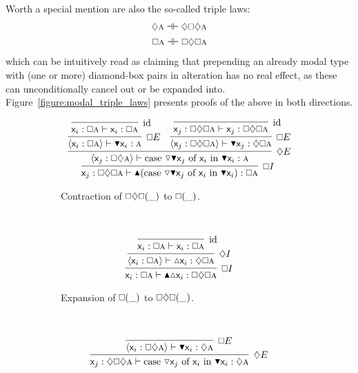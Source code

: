 Worth a special mention are also the so-called triple laws:
\begin{align}
	\diamond\prop{a} \dashv\vdash \diamond\bx\diamond\prop{a}\\
	\bx\prop{a} \dashv\vdash \bx\diamond\bx\prop{a}
\end{align}
which can be intuitively read as claiming that prepending an already modal type with (one or more) diamond-box pairs in alteration has no real effect, as these can unconditionally cancel out or be expanded into.
Figure~\ref{figure:modal_triple_laws} presents proofs of the above in both directions.


\begin{figure}
	\centering
	\begin{subfigure}{1\textwidth}
		\[
			\infer[\bx I]{\term{\varj}: \bx\diamond\bx\prop{a} \vdash \boxintro(\caseof{\diaelim \boxelim \varj}{\vari }{\boxelim{\vari }}): \bx\prop{a}}{
				\infer[\diamond E]{\bracket{\term{\varj}: \bx\diamond \prop{a}} \vdash \caseof{\diaelim \boxelim \varj}{\vari }{\boxelim{\vari }}: \prop{a}}{
					\infer[\bx E]{\bracket{\term{\vari }: \bx \prop{a}} \vdash \term{\boxelim \vari }:\prop{a}}{
						\infer[\Ax]{\term{\vari }: \bx\prop{a} \vdash \term{\vari }: \bx\prop{a}}{}
					}
					&
					\infer[\bx E]{\bracket{\term{\varj}:\bx\diamond\bx\prop{a}} \vdash \term{\boxelim \varj}:\diamond\bx\prop{a}}{
						\infer[\Ax]{\term{\varj}: \bx\diamond\bx\prop{a}\vdash\term{\varj}:\bx\diamond\bx\prop{a}}{}
					}
				}
			}
		\]
		\caption{Contraction of $\bx\diamond\bx(\_)$ to $\bx(\_)$.}
		\label{subfigure:triple_law:box_collapse}
	\end{subfigure}\\[\midsep]
	\begin{subfigure}{1\textwidth}
		\[
			\infer[\bx I]{\term{\vari }:\bx\prop{a} \vdash \boxintro\diaintro\term{\vari }:\bx\diamond\bx\prop{a}}{
				\infer[\diamond I]{\bracket{\term{\vari }: \bx\prop{a}} \vdash \diaintro\term{\vari }:\diamond\bx\prop{a}}{
					\infer[\Ax]{\term{\vari }:\bx\prop{a}\vdash \term{\vari }:\bx\prop{a}}{}
				}
			}
		\]
		\caption{Expansion of $\bx(\_)$ to $\bx\diamond\bx(\_)$.}
		\label{subfigure:triple_law:box_expand}
	\end{subfigure}\\[\midsep]
	\begin{subfigure}{1\textwidth}
		\[
			\infer[\diamond E]{\term{\varj}:\diamond\bx\diamond\prop{a} \vdash \caseof{\diaelim \varj}{\vari }{\boxelim \vari }: \diamond\prop{a}}{
				\infer[\bx E]{\bracket{\term{\vari }: \bx\diamond\prop{a}} \vdash \boxelim\term{\vari }: \diamond\prop{a}}{
}}\]
\end{subfigure}
\end{figure}
